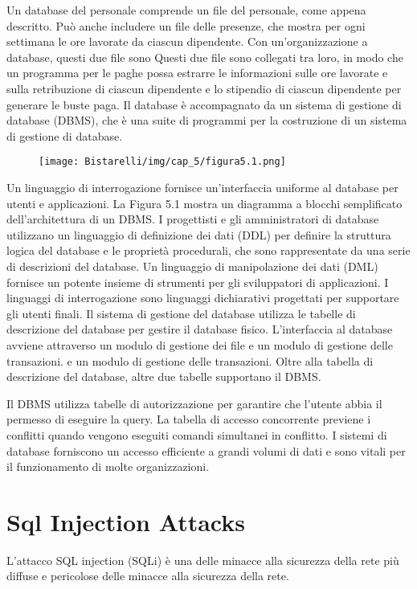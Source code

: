 \singlespacing

Un database del personale comprende un file del personale, come appena descritto. Può anche includere un file delle presenze, che mostra per ogni settimana le ore lavorate da ciascun dipendente. Con un'organizzazione a database, questi due file sono Questi due file sono collegati tra loro, in modo che un programma per le paghe possa estrarre le informazioni sulle ore lavorate e sulla retribuzione di ciascun dipendente e lo stipendio di ciascun dipendente per generare le buste paga. Il database è accompagnato da un sistema di gestione di database (DBMS), che è una suite di programmi per la costruzione di un sistema di gestione di database.

\singlespacing

\begin{figure}[H]
	\centering
    \texttt{[image: Bistarelli/img/cap\_5/figura5.1.png]}
\end{figure}

Un linguaggio di interrogazione fornisce un'interfaccia uniforme al database per utenti e applicazioni.
La Figura 5.1 mostra un diagramma a blocchi semplificato dell'architettura di un DBMS. I progettisti e gli amministratori di database utilizzano un linguaggio di definizione dei dati (DDL) per definire la struttura logica del database e le proprietà procedurali, che sono rappresentate da una serie di descrizioni del database. Un linguaggio di manipolazione dei dati (DML) fornisce un potente insieme di strumenti per gli sviluppatori di applicazioni. I linguaggi di interrogazione sono linguaggi dichiarativi progettati per supportare gli utenti finali. Il sistema di gestione del database utilizza le tabelle di descrizione del database per gestire il database fisico.
L'interfaccia al database avviene attraverso un modulo di gestione dei file e un modulo di gestione delle transazioni.
e un modulo di gestione delle transazioni. Oltre alla tabella di descrizione del database, altre due tabelle supportano il DBMS.

\singlespacing

Il DBMS utilizza tabelle di autorizzazione per garantire che l'utente abbia il permesso di eseguire la query. La tabella di accesso concorrente previene i conflitti quando vengono eseguiti comandi simultanei in conflitto. I sistemi di database forniscono un accesso efficiente a grandi volumi di dati e sono vitali per il funzionamento di molte organizzazioni. 

\section{Sql Injection Attacks}
L'attacco SQL injection (SQLi) è una delle minacce alla sicurezza della rete più diffuse e pericolose delle minacce alla sicurezza della rete. 

